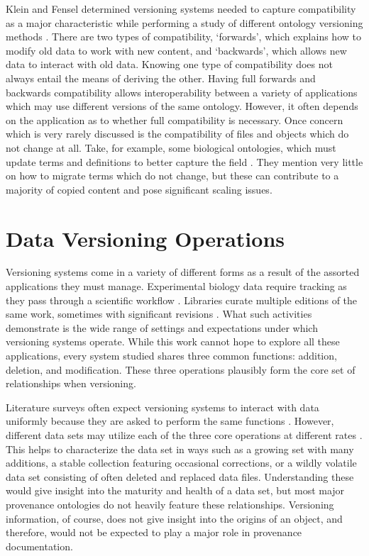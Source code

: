 Klein and Fensel determined versioning systems needed to capture compatibility as a major characteristic while performing a study of different ontology versioning methods \cite{Klein01ontologyversioning}.
There are two types of compatibility, `forwards', which explains how to modify old data to work with new content, and `backwards', which allows new data to interact with old data.
Knowing one type of compatibility does not always entail the means of deriving the other.
Having full forwards and backwards compatibility allows interoperability between a variety of applications which may use different versions of the same ontology.
However, it often depends on the application as to whether full compatibility is necessary.
Once concern which is very rarely discussed is the compatibility of files and objects which do not change at all.
Take, for example, some biological ontologies, which must update terms and definitions to better capture the field \cite{Ochs:2015:SVS:2826733.2826866}.
They mention very little on how to migrate terms which do not change, but these can contribute to a majority of copied content and pose significant scaling issues.

\section{Data Versioning Operations}

Versioning systems come in a variety of different forms as a result of the assorted applications they must manage.
Experimental biology data require tracking as they pass through a scientific workflow \cite{Tagger2005}.
Libraries curate multiple editions of the same work, sometimes with significant revisions \cite{Wiil:2000:RDH:338407.338517}.
What such activities demonstrate is the wide range of settings and expectations under which versioning systems operate.
While this work cannot hope to explore all these applications, every system studied shares three common functions: addition, deletion, and modification.
These three operations plausibly form the core set of relationships when versioning.

Literature surveys often expect versioning systems to interact with data uniformly because they are asked to perform the same functions \cite{Tagger2005}.
However, different data sets may utilize each of the three core operations at different rates \cite{rohtua}.
This helps to characterize the data set in ways such as a growing set with many additions, a stable collection featuring occasional corrections, or a wildly volatile data set consisting of often deleted and replaced data files.
Understanding these would give insight into the maturity and health of a data set, but most major provenance ontologies do not heavily feature these relationships.
Versioning information, of course, does not give insight into the origins of an object, and therefore, would not be expected to play a major role in provenance documentation.

